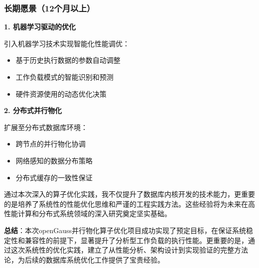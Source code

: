 \subsubsection{长期愿景（12个月以上）}

\textbf{1. 机器学习驱动的优化}

引入机器学习技术实现智能化性能调优：
\begin{itemize}
    \item 基于历史执行数据的参数自动调整
    \item 工作负载模式的智能识别和预测
    \item 硬件资源使用的动态优化决策
\end{itemize}

\textbf{2. 分布式并行物化}

扩展至分布式数据库环境：
\begin{itemize}
    \item 跨节点的并行物化协调
    \item 网络感知的数据分布策略
    \item 分布式缓存的一致性保证
\end{itemize}

通过本次深入的算子优化实践，我不仅提升了数据库内核开发的技术能力，更重要的是培养了系统性的性能优化思维和严谨的工程实践方法。这些经验将为未来在高性能计算和分布式系统领域的深入研究奠定坚实基础。

\textbf{总结}：本次openGauss并行物化算子优化项目成功实现了预定目标，在保证系统稳定性和兼容性的前提下，显著提升了分析型工作负载的执行性能。更重要的是，通过这次系统性的优化实践，建立了从性能分析、架构设计到实现验证的完整方法论，为后续的数据库系统优化工作提供了宝贵经验。